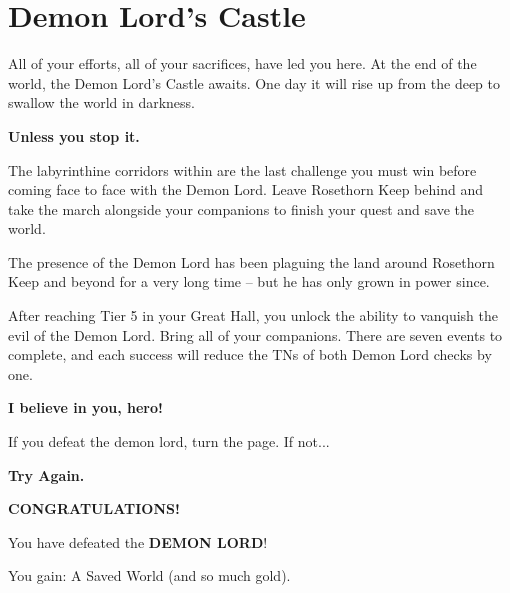 \chapter{Demon Lord's Castle}

\thispagestyle{empty}

All of your efforts, all of your sacrifices, have led you here. At the end of the world, the Demon Lord’s Castle awaits. One day it will rise up from the deep to swallow the world in darkness.

\skipline

\textbf{Unless you stop it.}

\skipline

The labyrinthine corridors within are the last challenge you must win before coming face to face with the Demon Lord. Leave Rosethorn Keep behind and take the march alongside your companions to finish your quest and save the world.

\skipline

The presence of the Demon Lord has been plaguing the land around Rosethorn Keep and beyond for a very long time – but he has only grown in power since.

\skipline

After reaching Tier 5 in your Great Hall, you unlock the ability to vanquish the evil of the Demon Lord. Bring all of your companions. There are seven events to complete, and each success will reduce the TNs of both Demon Lord checks by one.

\skipline %
\skipline %

\begin{adjustbox}{center}
	\textbf{\large{I believe in you, hero!}}
\end{adjustbox}

\pagebreak



If you defeat the demon lord, turn the page. If not...

\skipline
\skipline

\begin{adjustbox}{center}
	\textbf{Try Again.}
\end{adjustbox}

\pagebreak

\thispagestyle{empty}
\vspace*{\fill}
\begin{adjustbox}{center}
\end{adjustbox}
\begin{adjustbox}{center}
	\textbf{CONGRATULATIONS!}
\end{adjustbox}
\begin{adjustbox}{center}
	You have defeated the \textbf{DEMON LORD}!
\end{adjustbox}
\begin{adjustbox}{center}
	You gain: A Saved World (and so much gold).
\end{adjustbox}
\vspace*{\fill}
%
